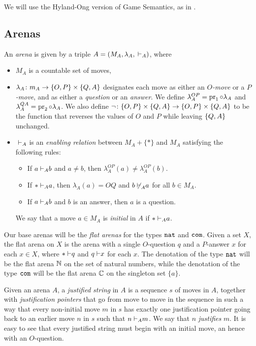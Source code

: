 \documentclass[sigplan,10pt,review]{acmart}\settopmatter{printfolios=true,printccs=false,printacmref=false}
\begin{document}
We will use the Hyland-Ong version of Game Semantics, as in \cite{SamsonGuyIAPassive}.

\subsection{Arenas}

An \emph{arena} is given by a triple $A=(M_A,\lambda_A,{\;\vdash}_A)$, where
\begin{itemize}
  \item $M_A$ is a countable set of moves,
  \item $\lambda_A\colon m_A\to\{O,P\}\times\{Q,A\}$ designates each move as either an \emph{$O$-move} or a \emph{$P$-move}, and as either a \emph{question} or an \emph{answer}.  
    We define $\lambda_A^{OP}=\operatorname{pr}_1\circ\lambda_A$ and $\lambda_A^{QA}=\operatorname{pr}_2\circ\lambda_A$.  
    We also define $\neg\colon\{O,P\}\times\{Q,A\}\to\{O,P\}\times\{Q,A\}$ to be the function that reverses the values of $O$ and $P$ while leaving $\{Q,A\}$ unchanged.
  \item ${\;\vdash}_A$ is an \emph{enabling relation} between $M_A+\{*\}$ and $M_A$ satisfying the following rules:
    \begin{itemize}
      \item If $a{\;\vdash}_A b$ and $a\ne b$, then $\lambda_A^{OP}(a)\neq\lambda_A^{OP}(b)$.  
      \item If $*{\;\vdash}_A a$, then $\lambda_A(a)=OQ$ and $b{\;\not\vdash}_A a$ for all $b\in M_A$.
      \item If $a{\;\vdash}_A b$ and $b$ is an answer, then $a$ is a question.
    \end{itemize}
    We say that a move $a\in M_A$ is \emph{initial} in $A$ if $*{\;\vdash}_A a$.
\end{itemize}

Our base arenas will be the \emph{flat arenas} for the types ${\mathtt{nat}}$ and ${\mathtt{com}}$.  
Given a set $X$, the flat arena on $X$ is the arena with a single $O$-question $q$ and a $P$-answer $x$ for each $x\in X$, where $*{\;\vdash} q$ and $q{\;\vdash} x$ for each $x$.  
The denotation of the type ${\mathtt{nat}}$ will be the flat arena $\mathbb{N}$ on the set of natural numbers, while the denotation of the type ${\mathtt{com}}$ will be the flat arena $\mathbb{C}$ on the singleton set $\{a\}$.

Given an arena $A$, a \emph{justified string} in $A$ is a sequence $s$ of moves in $A$, together with \emph{justification pointers} that go from move to move in the sequence in such a way that every non-initial move $m$ in $s$ has exactly one justification pointer going back to an earlier move $n$ in $s$ such that $n{\;\vdash}_A m$.  
We say that $n$ \emph{justifies} $m$.  
It is easy to see that every justified string must begin with an initial move, an hence with an $O$-question.  
\end{document}
